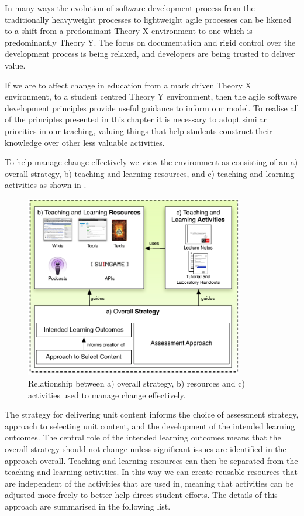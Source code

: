 In many ways the evolution of software development process from the traditionally heavyweight processes to lightweight agile processes can be likened to a shift from a predominant Theory X environment to one which is predominantly Theory Y. The focus on documentation and rigid control over the development process is being relaxed, and developers are being trusted to deliver value. 

If we are to affect change in education from a mark driven Theory X environment, to a student centred Theory Y environment, then the agile software development principles provide useful guidance to inform our model. To realise all of the principles presented in this chapter it is necessary to adopt similar priorities in our teaching, valuing things that help students construct their knowledge over other less valuable activities.

To help manage change effectively we view the environment as consisting of an a) overall strategy, b) teaching and learning resources, and c) teaching and learning activities as shown in . 

\begin{figure}[htbp]
	\centering
	\includegraphics[width=0.85\textwidth]{StrategyResourcesActivities}
	\caption{Relationship between a) overall strategy, b) resources and c) activities used to manage change effectively.}
	\label{fig:strategy}
\end{figure}

The strategy for delivering unit content informs the choice of assessment strategy, approach to selecting unit content, and the development of the intended learning outcomes. The central role of the intended learning outcomes means that the overall strategy should not change unless significant issues are identified in the approach overall. Teaching and learning resources can then be separated from the teaching and learning activities. In this way we can create reusable resources that are independent of the activities that are used in, meaning that activities can be adjusted more freely to better help direct student efforts. The details of this approach are summarised in the following list.

